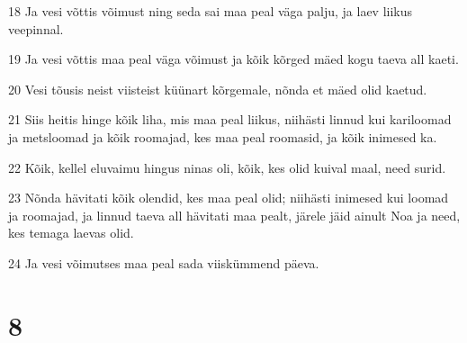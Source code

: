 \par 18 Ja vesi võttis võimust ning seda sai maa peal väga palju, ja laev liikus veepinnal.
\par 19 Ja vesi võttis maa peal väga võimust ja kõik kõrged mäed kogu taeva all kaeti.
\par 20 Vesi tõusis neist viisteist küünart kõrgemale, nõnda et mäed olid kaetud.
\par 21 Siis heitis hinge kõik liha, mis maa peal liikus, niihästi linnud kui kariloomad ja metsloomad ja kõik roomajad, kes maa peal roomasid, ja kõik inimesed ka.
\par 22 Kõik, kellel eluvaimu hingus ninas oli, kõik, kes olid kuival maal, need surid.
\par 23 Nõnda hävitati kõik olendid, kes maa peal olid; niihästi inimesed kui loomad ja roomajad, ja linnud taeva all hävitati maa pealt, järele jäid ainult Noa ja need, kes temaga laevas olid.
\par 24 Ja vesi võimutses maa peal sada viiskümmend päeva.

\chapter{8}

